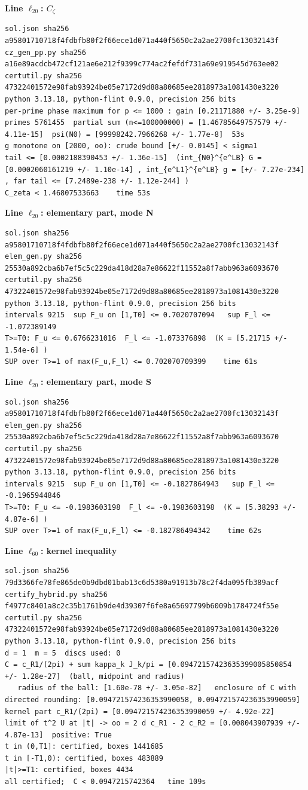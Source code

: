 \documentclass[11pt,reqno]{amsart}
\numberwithin{equation}{section}
\theoremstyle{definition}
\theoremstyle{remark}
\newcommand{\appsub}[1]{\par\medskip\noindent\textbf{#1}\par\nobreak\smallskip}
\begin{document}
\appsub{Line $\ell_{20}$: $C_\zeta$}
\begin{lstlisting}
sol.json sha256 a95801710718f4fdbfb80f2f66ece1d071a440f5650c2a2ae2700fc13032143f
cz_gen_pp.py sha256 a16e89acdcb472cf121ae6e212f9399c774ac2fefdf731a69e919545d763ee02
certutil.py sha256 47322401572e98fab93924be05e7172d9d88a80685ee2818973a1081430e3220
python 3.13.18, python-flint 0.9.0, precision 256 bits
per-prime phase maximum for p <= 1000 : gain [0.21171880 +/- 3.25e-9]
primes 5761455  partial sum (n<=100000000) = [1.46785649757579 +/- 4.11e-15]  psi(N0) = [99998242.7966268 +/- 1.77e-8]  53s
g monotone on [2000, oo): crude bound [+/- 0.0145] < sigma1
tail <= [0.0002188390453 +/- 1.36e-15]  (int_{N0}^{e^LB} G = [0.0002060161219 +/- 1.10e-14] , int_{e^L1}^{e^LB} g = [+/- 7.27e-234] , far tail <= [7.2489e-238 +/- 1.12e-244] )
C_zeta < 1.46807533663    time 53s
\end{lstlisting}
\appsub{Line $\ell_{20}$: elementary part, mode N}
\begin{lstlisting}
sol.json sha256 a95801710718f4fdbfb80f2f66ece1d071a440f5650c2a2ae2700fc13032143f
elem_gen.py sha256 25530a892cba6b7ef5c5c229da418d28a7e86622f11552a8f7abb963a6093670
certutil.py sha256 47322401572e98fab93924be05e7172d9d88a80685ee2818973a1081430e3220
python 3.13.18, python-flint 0.9.0, precision 256 bits
intervals 9215  sup F_u on [1,T0] <= 0.7020707094   sup F_l <= -1.072389149
T>=T0: F_u <= 0.6766231016  F_l <= -1.073376898  (K = [5.21715 +/- 1.54e-6] )
SUP over T>=1 of max(F_u,F_l) <= 0.702070709399    time 61s
\end{lstlisting}
\appsub{Line $\ell_{20}$: elementary part, mode S}
\begin{lstlisting}
sol.json sha256 a95801710718f4fdbfb80f2f66ece1d071a440f5650c2a2ae2700fc13032143f
elem_gen.py sha256 25530a892cba6b7ef5c5c229da418d28a7e86622f11552a8f7abb963a6093670
certutil.py sha256 47322401572e98fab93924be05e7172d9d88a80685ee2818973a1081430e3220
python 3.13.18, python-flint 0.9.0, precision 256 bits
intervals 9215  sup F_u on [1,T0] <= -0.1827864943   sup F_l <= -0.1965944846
T>=T0: F_u <= -0.1983603198  F_l <= -0.1983603198  (K = [5.38293 +/- 4.87e-6] )
SUP over T>=1 of max(F_u,F_l) <= -0.182786494342    time 62s
\end{lstlisting}
\appsub{Line $\ell_{60}$: kernel inequality}
\begin{lstlisting}
sol.json sha256 79d3366fe78fe865de0b9dbd01bab13c6d5380a91913b78c2f4da095fb389acf
certify_hybrid.py sha256 f4977c8401a8c2c35b1761b9de4d39307f6fe8a65697799b6009b1784724f55e
certutil.py sha256 47322401572e98fab93924be05e7172d9d88a80685ee2818973a1081430e3220
python 3.13.18, python-flint 0.9.0, precision 256 bits
d = 1  m = 5  discs used: 0 
C = c_R1/(2pi) + sum kappa_k J_k/pi = [0.09472157423635399005850854 +/- 1.28e-27]  (ball, midpoint and radius)
   radius of the ball: [1.60e-78 +/- 3.05e-82]   enclosure of C with directed rounding: [0.094721574236353990058, 0.094721574236353990059]
kernel part c_R1/(2pi) = [0.094721574236353990059 +/- 4.92e-22]
limit of t^2 U at |t| -> oo = 2 d c_R1 - 2 c_R2 = [0.008043907939 +/- 4.87e-13]  positive: True
t in (0,T1]: certified, boxes 1441685
t in [-T1,0): certified, boxes 483889
|t|>=T1: certified, boxes 4434
all certified;  C < 0.0947215742364   time 109s
\end{lstlisting}
\end{document}
